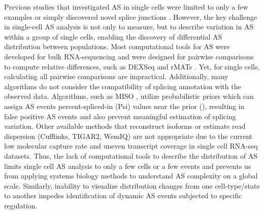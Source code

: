 Previous studies that investigated AS in single cells were limited to only a few examples \cite{Shalek2013-ez,Waks2011-ye} or simply discovered novel splice junctions \cite{Marinov2014-iw}. However, the key challenge in single-cell AS analysis is not only to measure, but to describe variation in AS within a group of single cells, enabling the discovery of differential AS distribution between populations. Most computational tools for AS were developed for bulk RNA-sequencing and were designed for pairwise comparisons to compute relative differences, such as DEXSeq \cite{Anders2012-fq} and rMATs \cite{Shen2014-zq}. Yet, for single cells, calculating all pairwise comparisons are impractical. Additionally, many algorithms do not consider the compatibility of splicing annotation with the observed data. Algorithms, such as MISO \cite{Katz:2010iv}, utilize probabilistic priors which can assign AS events percent-spliced-in (Psi) values near the prior (), resulting in false positive AS events and also prevent meaningful estimation of splicing variation. Other available methods that reconstruct isoforms or estimate read dispersion (Cufflinks, TIGAR2, WemIQ) \cite{Nariai:2014hd,Roberts2012-yx,Zhang:2015hx} are not appropriate due to the current low molecular capture rate and uneven transcript coverage in single cell RNA-seq datasets. Thus, the lack of computational tools to describe the distribution of AS limits single cell AS analysis to only a few cells or a few events and prevents us from applying systems biology methods to understand AS complexity on a global scale. Similarly, inability to visualize distribution changes from one cell-type/state to another impedes identification of dynamic AS events subjected to specific regulation.

